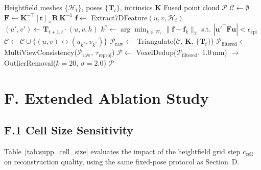 \documentclass[review]{elsarticle}
\begin{document}
\begin{algorithm}[h]
\caption{Dense Epipolar Matching and Metric Fusion}
\label{alg:fusion}
\begin{algorithmic}[1]
\REQUIRE Heightfield meshes $\{\mathcal{H}_t\}$, poses $\{\mathbf{T}_t\}$, intrinsics $\mathbf{K}$
\ENSURE Fused point cloud $\mathcal{P}$
\STATE $\mathcal{C} \leftarrow \emptyset$ 
    \STATE $\mathbf{F} \leftarrow \mathbf{K}^{-\top}[\mathbf{t}]_\times \mathbf{R}\,\mathbf{K}^{-1}$ 
        \STATE $\mathbf{f} \leftarrow$ Extract7DFeature$(u,v,\mathcal{H}_t)$
        \STATE $(u',v') \leftarrow \mathbf{T}_{t+1,t} \cdot (u,v,h)$ 
        \STATE $k^* \leftarrow \arg\min_{k \in W_r} \|\mathbf{f} - \mathbf{f}_k\|_2$ s.t. $|\mathbf{u}'^\top \mathbf{F}\mathbf{u}| < \epsilon_{\mathrm{epi}}$
            \STATE $\mathcal{C} \leftarrow \mathcal{C} \cup \{(u,v) \leftrightarrow (u_{k^*}, v_{k^*})\}$
        \ENDIF
    \ENDFOR
\ENDFOR
\STATE $\mathcal{P}_{\mathrm{raw}} \leftarrow$ Triangulate($\mathcal{C}$, $\mathbf{K}$, $\{\mathbf{T}_t\}$) 
\STATE $\mathcal{P}_{\mathrm{filtered}} \leftarrow$ MultiViewConsistency($\mathcal{P}_{\mathrm{raw}}$, $\tau_{\mathrm{reproj}}$)
\STATE $\mathcal{P} \leftarrow$ VoxelDedup($\mathcal{P}_{\mathrm{filtered}}$, 1.0\,mm) $\to$ OutlierRemoval($k{=}20$, $\sigma{=}2.0$)
\RETURN $\mathcal{P}$
\end{algorithmic}
\end{algorithm}

\section*{F. Extended Ablation Study}

\subsection*{F.1 Cell Size Sensitivity}

Table~\ref{tab:supp_cell_size} evaluates the impact of the heightfield grid step $c_{\mathrm{cell}}$ on reconstruction quality, using the same fixed-pose protocol as Section~D.
\end{document}
